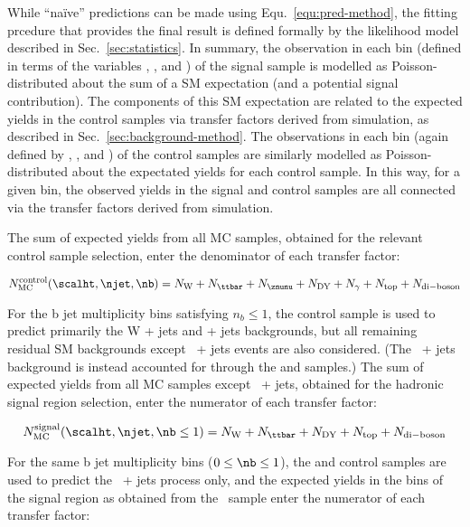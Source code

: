 While ``na\"ive'' predictions can be made using
Equ.~\ref{equ:pred-method}, the fitting prcedure that provides the
final result is defined formally by the likelihood model described in
Sec.~\ref{sec:statistics}. In summary, the observation in each bin
(defined in terms of the variables \njet, \nb, and \scalht) of the
signal sample is modelled as Poisson-distributed about the sum of a SM
expectation (and a potential signal contribution). The components of
this SM expectation are related to the expected yields in the control
samples via transfer factors derived from simulation, as described
in Sec.~\ref{sec:background-method}. The observations in each bin
(again defined by \njet, \nb, and \scalht) of the control samples are
similarly modelled as Poisson-distributed about the expectated yields
for each control sample. In this way, for a given bin, the observed
yields in the signal and control samples are all connected via the
transfer factors derived from simulation.

The sum of expected yields from all MC samples, obtained for the
relevant control sample selection, enter the denominator of each
transfer factor:

\begin{equation}
  \label{equ:ratio-denom}
  N_{\rm MC}^{\rm control}(\scalht,\njet,\nb) = N_{\rm W} + N_{\ttbar} + N_{\znunu} +
N_{\rm DY} + N_{\gamma} + N_{\rm top} + N_{\rm di-boson}
\end{equation}

For the b jet multiplicity bins satisfying $n_b \leq 1$, the \mj
control sample is used to predict primarily the W + jets and \ttbar +
jets backgrounds, but all remaining residual SM backgrounds except
\znunu\ + jets events are also considered. (The \znunu\ + jets
background is instead accounted for through the \mmj and \gj samples.)
The sum of expected yields from all MC samples except \znunu\ + jets,
obtained for the hadronic signal region selection, enter the numerator
of each transfer factor:

\begin{equation}
  \label{equ:ratio-numer-mj}
  N_{\rm MC}^{\rm signal}(\scalht,\njet,\nb \leq 1) = N_{\rm W} +
  N_{\ttbar} + N_{\rm DY} + N_{\rm top} + N_{\rm di-boson}
\end{equation}

For the same b jet multiplicity bins ($0 \leq \nb \leq 1$), the \mmj
and \gj control samples are used to predict the \znunu\ + jets process
only, and the expected yields in the bins of the signal region as
obtained from the \znunu\ sample enter the numerator of each transfer
factor:

